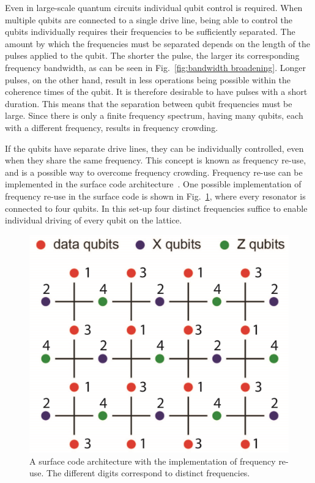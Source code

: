       Even in large-scale quantum circuits individual qubit control is required. When multiple qubits are connected to a single drive line, being able to control the qubits individually requires their frequencies to be sufficiently separated. The amount by which the frequencies must be separated depends on the length of the pulses applied to the qubit. The shorter the pulse, the larger its corresponding frequency bandwidth, as can be seen in Fig.~\ref{fig:bandwidth broadening}. Longer pulses, on the other hand, result in less operations being possible within the coherence times of the qubit. It is therefore desirable to have pulses with a short duration. This means that the separation between qubit frequencies must be large. Since there is only a finite frequency spectrum, having many qubits, each with a different frequency, results in frequency crowding.

      If the qubits have separate drive lines, they can be individually controlled, even when they share the same frequency. This concept is known as frequency re-use, and is a possible way to overcome frequency crowding. Frequency re-use can be implemented in the surface code architecture~\cite{fowler2009high}. One possible implementation of frequency re-use in the surface code is shown in Fig.~\ref{fig:surface code frequency re-use}, where every resonator is connected to four qubits. In this set-up four distinct frequencies suffice to enable individual driving of every qubit on the lattice.

      \begin{figure}[h]
        \centering
        \includegraphics[width=.6\textwidth]{Figures/Exploring frequency re-use/surface_code_frequency re-use_cut.jpg}
        \caption{A surface code architecture with the implementation of frequency re-use. The different digits correspond to distinct frequencies. }
        \label{fig:surface code frequency re-use}
      \end{figure}

